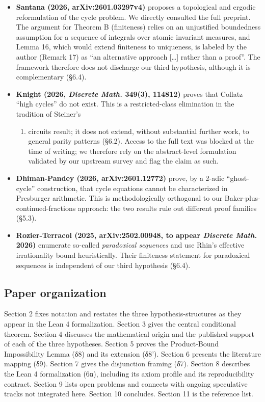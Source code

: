 \documentclass[
  11pt]{amsart}
\providecommand{\tightlist}{%
  \setlength{\itemsep}{0pt}\setlength{\parskip}{0pt}}
\theoremstyle{plain}
\theoremstyle{definition}
\theoremstyle{remark}
\begin{document}
\begin{itemize}
\item
  \textbf{Santana (2026, arXiv:2601.03297v4)} proposes a topological and
  ergodic reformulation of the cycle problem. We directly consulted the
  full preprint. The argument for Theorem B (finiteness) relies on an
  unjustified boundedness assumption for a sequence of integrals over
  atomic invariant measures, and Lemma 16, which would extend finiteness
  to uniqueness, is labeled by the author (Remark 17) as ``an
  alternative approach {[}\ldots{]} rather than a proof''. The framework
  therefore does not discharge our third hypothesis, although it is
  complementary (§6.4).
\item
  \textbf{Knight (2026, \emph{Discrete Math.} 349(3), 114812)} proves
  that Collatz ``high cycles'' do not exist. This is a restricted-class
  elimination in the tradition of Steiner's

  \begin{enumerate}
  \def\labelenumi{(\arabic{enumi})}
  \setcounter{enumi}{1976}
  \tightlist
  \item
    circuits result; it does not extend, without substantial further
    work, to general parity patterns (§6.2). Access to the full text was
    blocked at the time of writing; we therefore rely on the
    abstract-level formulation validated by our upstream survey and flag
    the claim as such.
  \end{enumerate}
\item
  \textbf{Dhiman-Pandey (2026, arXiv:2601.12772)} prove, by a 2-adic
  ``ghost-cycle'' construction, that cycle equations cannot be
  characterized in Presburger arithmetic. This is methodologically
  orthogonal to our Baker-plus-continued-fractions approach: the two
  results rule out different proof families (§5.3).
\item
  \textbf{Rozier-Terracol (2025, arXiv:2502.00948, to appear
  \emph{Discrete Math.} 2026)} enumerate so-called \emph{paradoxical
  sequences} and use Rhin's effective irrationality bound heuristically.
  Their finiteness statement for paradoxical sequences is independent of
  our third hypothesis (§6.4).
\end{itemize}

\subsection{Paper organization}\label{paper-organization}

Section 2 fixes notation and restates the three hypothesis-structures as
they appear in the Lean 4 formalization. Section 3 gives the central
conditional theorem. Section 4 discusses the mathematical origin and the
published support of each of the three hypotheses. Section 5 proves the
Product-Bound Impossibility Lemma (δ8) and its extension (δ8'). Section
6 presents the literature mapping (δ9). Section 7 gives the disjunction
framing (δ7). Section 8 describes the Lean 4 formalization (6α),
including its axiom profile and its reproducibility contract. Section 9
lists open problems and connects with ongoing speculative tracks not
integrated here. Section 10 concludes. Section 11 is the reference list.
\end{document}
